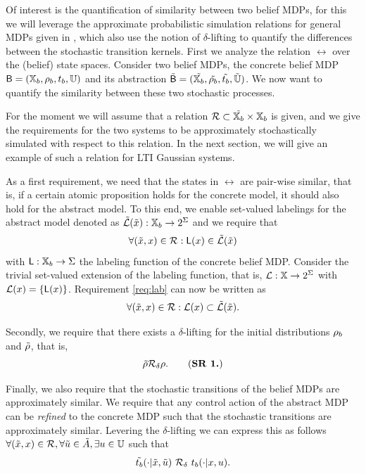 \documentclass{ifacconf}
\begin{document}
 Of interest is the quantification of similarity between two belief MDPs, for this we  will leverage the approximate probabilistic simulation relations for general MDPs given in \citep{haesaert2017verification}, which also 
 use  the notion of $\delta$-lifting to quantify the differences between the stochastic transition kernels.  First we analyze the relation $\rel$ over the (belief) state spaces.
\color{blue} Consider two belief MDPs, the concrete belief MDP $\mathsf{B}= ({{\mathbb{X}}_b}, \rho_b, t_b, {\mathbb{U}})$  and its abstraction $\tilde {\mathsf{B}}=(\tilde{{{\mathbb{X}}_b}}, \tilde{\rho_b}, \tilde{t_b}, \tilde{{\mathbb{U}}})$. 
We now want to quantify the similarity between these two stochastic processes.

  For the moment we will assume that a relation $\mathcal{R}\subset \tilde {{{\mathbb{X}}_b}} \times {{\mathbb{X}}_b}$ is given, and we give the requirements for the two systems to be approximately stochastically simulated with respect to this relation. In the next section, we will give an example of such a relation for LTI Gaussian systems. 

As a first requirement, we need that the states in $\rel$ are pair-wise similar, that is, if a certain atomic proposition holds for the concrete model, it should also hold for the abstract model. To this end, we enable set-valued labelings for the abstract model denoted as  $ \tilde{\mathcal{L}}(\tilde x):{{\mathbb{X}}_b}\rightarrow2^\Sigma$ and we require that  \begin{equation}\label{req:lab}
  \forall (\tilde x,x )\in \mathcal{R}:  \mathsf{L}(x)\in \tilde{\mathcal{L}}(\tilde x)
  \end{equation} with $\mathsf{L}:{{\mathbb{X}}_b}\rightarrow\Sigma$ the labeling function of the concrete belief MDP.
Consider 
 the trivial set-valued extension of  the labeling function, that is,  $\mathcal{L}:{\mathbb{X}}\rightarrow2^\Sigma$ with
 $\mathcal{L}(x)=\{\mathsf{L}(x)\}$.
Requirement \eqref{req:lab} can now be written as  \begin{equation}
  \forall (\tilde x,x )\in \mathcal{R}:  \mathcal{L}(x)\subset \tilde{\mathcal{L}}(\tilde x).
  \end{equation} 
  
Secondly, we require that there exists a $\delta$-lifting for the initial distributions $\rho_b$ and $\tilde{\rho}$, that is,
\begin{equation}
\tilde\init \bar \rel_\delta \init.
	\tag{\textbf{SR 1.}}
\end{equation}

Finally, we also require that the stochastic transitions of the belief MDPs are approximately similar.  We require that any control action of the abstract MDP can be \emph{refined} to the concrete MDP such that the stochastic transitions are approximately similar. Levering the $\delta$-lifting  we can  express this as follows $\forall (\tilde x, x)\in \mathcal{R}, \forall \tilde u \in \tilde A, \exists u \in {\mathbb{U}}$ such that 
\begin{equation}\label{req:translifting}
	\tilde {t_b}(\cdot| \tilde x, \tilde u)\ \relax \mathcal{R}_\delta \  t_b(\cdot| x, u).
\end{equation}
\end{document}
